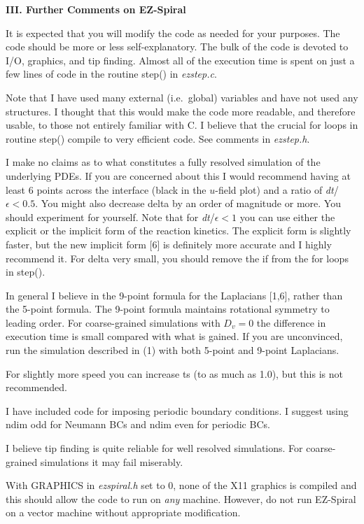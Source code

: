 {\bf III. Further Comments on EZ-Spiral} 

It is expected that you will modify the code as needed for your
purposes.  The code should be more or less self-explanatory. The bulk
of the code is devoted to I/O, graphics, and tip finding. Almost all
of the execution time is spent on just a few lines of code in the
routine {\sf step()} in {\em ezstep.c}.

Note that I have used many external (i.e.~global) variables and have
not used any structures.  I thought that this would make the code more
readable, and therefore usable, to those not entirely familiar with C.
I believe that the crucial {\sf for} loops in routine {\sf step()}
compile to very efficient code. See comments in {\em ezstep.h}.

I make no claims as to what constitutes a fully resolved simulation of
the underlying PDEs.  If you are concerned about this I would
recommend having at least 6 points across the interface (black in the
$u$-field plot) and a ratio of {\sl dt}/$\epsilon<0.5$.  You might
also decrease {\sf delta} by an order of magnitude or more.  You
should experiment for yourself.  Note that for {\sl dt}/$\epsilon<1$
you can use either the explicit or the implicit form of the reaction
kinetics.  The explicit form is slightly faster, but the new implicit
form [6] is definitely more accurate and I highly recommend it.  For
{\sf delta} very small, you should remove the {\sf if} from the {\sf
for} loops in {\sf step()}.

In general I believe in the 9-point formula for the Laplacians [1,6],
rather than the 5-point formula.  The 9-point formula maintains
rotational symmetry to leading order.  For coarse-grained simulations
with $D_v=0$ the difference in execution time is small compared with
what is gained.  If you are unconvinced, run the simulation described
in (1) with both 5-point and 9-point Laplacians.

For slightly more speed you can increase {\sf ts} (to as much as 1.0),
but this is not recommended.

I have included code for imposing periodic boundary conditions.  I
suggest using {\sf ndim} odd for Neumann BCs and {\sf ndim} even for
periodic BCs.

I believe tip finding is quite reliable for well resolved simulations.
For coarse-grained simulations it may fail miserably.

With {\sf GRAPHICS} in {\em ezspiral.h} set to 0, none of the X11
graphics is compiled and this should allow the code to run on {\em
any} machine.  However, do not run EZ-Spiral on a vector machine
without appropriate modification.

